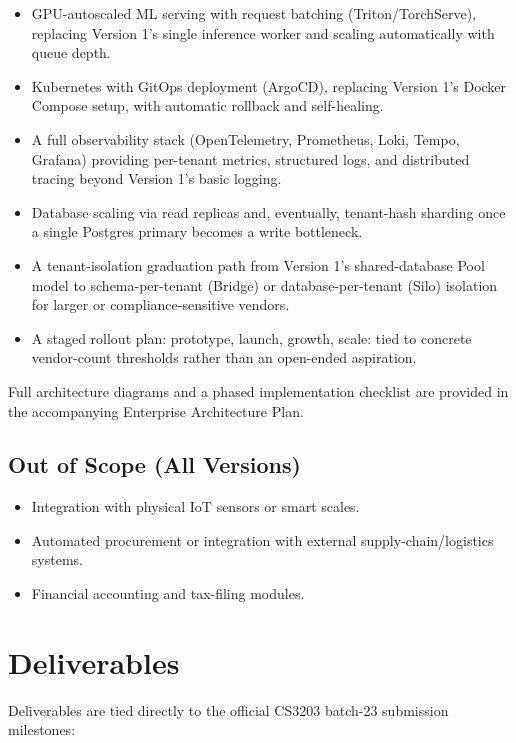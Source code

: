 \documentclass[12pt,a4paper]{article}
\begin{document}
\begin{itemize}[leftmargin=1.2cm]
    \item GPU-autoscaled ML serving with request batching (Triton/TorchServe), replacing Version 1's single inference worker and scaling automatically with queue depth.
    \item Kubernetes with GitOps deployment (ArgoCD), replacing Version 1's Docker Compose setup, with automatic rollback and self-healing.
    \item A full observability stack (OpenTelemetry, Prometheus, Loki, Tempo, Grafana) providing per-tenant metrics, structured logs, and distributed tracing beyond Version 1's basic logging.
    \item Database scaling via read replicas and, eventually, tenant-hash sharding once a single Postgres primary becomes a write bottleneck.
    \item A tenant-isolation graduation path from Version 1's shared-database Pool model to schema-per-tenant (Bridge) or database-per-tenant (Silo) isolation for larger or compliance-sensitive vendors.
    \item A staged rollout plan: prototype, launch, growth, scale: tied to concrete vendor-count thresholds rather than an open-ended aspiration.
\end{itemize}

Full architecture diagrams and a phased implementation checklist are provided in the accompanying Enterprise Architecture Plan.

\subsection{Out of Scope (All Versions)}
\begin{itemize}[leftmargin=1.2cm]
    \item Integration with physical IoT sensors or smart scales.
    \item Automated procurement or integration with external supply-chain/logistics systems.
    \item Financial accounting and tax-filing modules.
\end{itemize}

\newpage
\section{Deliverables}

Deliverables are tied directly to the official CS3203 batch-23 submission milestones:
\end{document}

